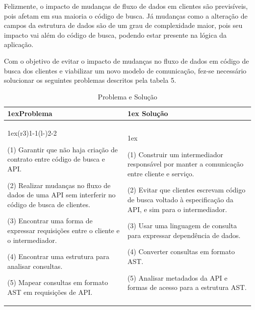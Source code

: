 Felizmente, o impacto de mudanças de fluxo de dados em clientes são previsíveis, pois afetam em sua maioria o código de busca. Já mudanças como a alteração de campos da estrutura de dados são de um grau de complexidade maior, pois seu impacto vai além do código de busca, podendo estar presente na lógica da aplicação.

Com o objetivo de evitar o impacto de mudanças no fluxo de dados em código de busca dos clientes e viabilizar um novo modelo de comunicação, fez-se necessário solucionar os seguintes problemas descritos pela tabela 5. \\

\begin{table}[H]
  \begin{tabularx}{\linewidth}{>{\parskip1ex}X@{\kern4\tabcolsep}>{\parskip1ex}X}
    \toprule
    \hfil\bfseries Problema
    &
    \hfil\bfseries Solução
    \\\cmidrule(r{3\tabcolsep}){1-1}\cmidrule(l{-\tabcolsep}){2-2}

    (1) Garantir que não haja criação de contrato entre código de busca e API.\par
    (2) Realizar mudanças no fluxo de dados de uma API sem interferir no código de busca de clientes.\par
    (3) Encontrar uma forma de expressar requisições entre o cliente e o intermediador.\par
    (4) Encontrar uma estrutura para analisar consultas.\par
    (5) Mapear consultas em formato AST em requisições de API.\par

    &

    (1) Construir um intermediador responsável por manter a comunicação entre cliente e serviço.\par
	(2) Evitar que clientes escrevam código de busca voltado à especificação da API, e sim para o intermediador.\par
    (3) Usar uma linguagem de consulta para expressar dependência de dados.\par
    (4) Converter consultas em formato AST.\par
    (5) Analisar metadados da API e formas de acesso para a estrutura AST.\par

    \\\bottomrule
  \end{tabularx}
  \caption{Problema e Solução}
\end{table}

